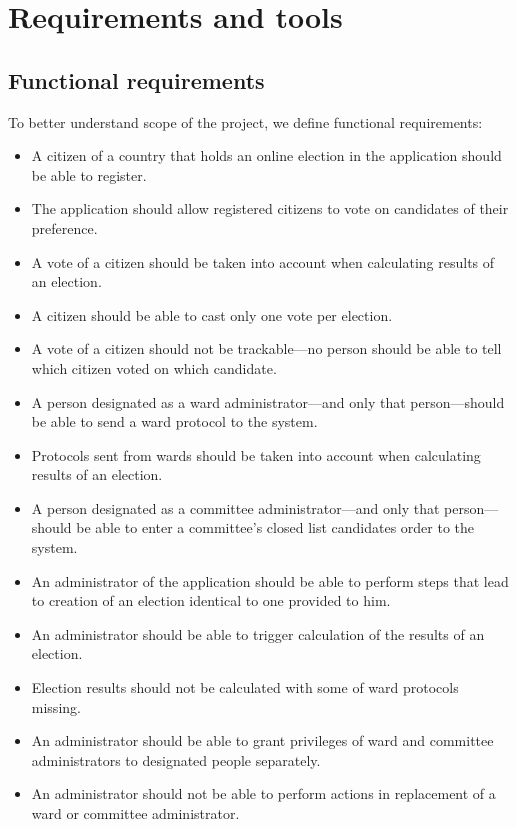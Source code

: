 \documentclass[a4paper,twoside,12pt]{book}
\begin{document}
\chapter{Requirements and tools}
\label{chap:req&tools}
  \section{Functional requirements}
    To better understand scope of the project, we define functional requirements:
    \begin{itemize}
      \item A citizen of a country that holds an online election in the application should be able to register.
      \item The application should allow registered citizens to vote on candidates of their preference.
      \item A vote of a citizen should be taken into account when calculating results of an election.
      \item A citizen should be able to cast only one vote per election.
      \item A vote of a citizen should not be trackable---no person should be able to tell which citizen voted on which candidate.
      \item A person designated as a ward administrator---and only that person---should be able to send a ward protocol to the system.
      \item Protocols sent from wards should be taken into account when calculating results of an election.
      \item A person designated as a committee administrator---and only that person---should be able to enter a committee's closed list candidates order to the system.
      \item An administrator of the application should be able to perform steps that lead to creation of an election identical to one provided to him.
      \item An administrator should be able to trigger calculation of the results of an election.
      \item Election results should not be calculated with some of ward protocols missing.
      \item An administrator should be able to grant privileges of ward and committee administrators to designated people separately.
      \item An administrator should not be able to perform actions in replacement of  a ward or committee administrator.
    \end{itemize}
    
\end{document}
